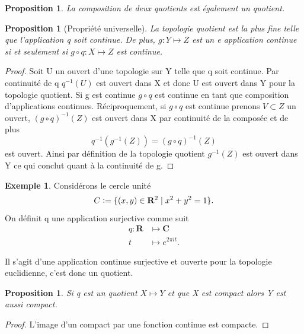\documentclass[12pt]{book}
\newcommand{\defeq}{\vcentcolon=}
\newtheorem{prop}[lemma]{Proposition}
\theoremstyle{definition}
\newtheorem{example}[lemma]{Exemple}
\theoremstyle{remark}
\begin{document}
	\begin{prop}
		La composition de deux quotients est également un quotient.
	\end{prop}
	\begin{prop}[Propriété universelle]
		La topologie quotient est la plus fine telle que l'application q soit continue. De plus, $g : Y \longmapsto Z$ est un e application continue si et seulement si	$g \circ q : X \longmapsto Z$ est continue.
	\end{prop}
	\begin{proof}
		Soit U un ouvert d'une topologie sur Y telle que q soit continue. Par continuité de q $q^{-1}(U)$ est ouvert dans X et donc U est ouvert dans Y pour la topologie quotient. 
		Si g est continue $g \circ q$ est continue en tant que composition d'applications continues. Réciproquement, si  $g \circ q$ est continue prenons $V \subset Z$ un ouvert, $(g\circ q)^{-1}(Z)$ est ouvert dans X par continuité de la composée et de plus \[
			q^{-1}(g^{-1}(Z)) = (g \circ q)^{-1}(Z)
		\] est ouvert. Ainsi par définition de la topologie quotient $g^{-1}(Z)$ est ouvert dans Y ce qui conclut quant à la continuité de g. 
	\end{proof}
	\begin{example}
		Considérons le cercle unité \[
			C \defeq \{(x,y) \in \mathbf{R}^2 \;|\; x^2 + y^2 = 1\} 
		.\] 
		On définit q une application surjective comme suit \\ 
			\begin{align*}
				q : \mathbf{R} &\longmapsto \mathbf{C}\\
				t&\longmapsto e^{2\pi it}
			.\end{align*}	

		Il s'agit d'une application continue surjective et ouverte pour la topologie euclidienne, c'est donc un quotient.
	\end{example}
	
	\begin{prop}
		Si q est un quotient $X \longmapsto Y$ et que X est compact alors Y est aussi compact.
	\end{prop}
	\begin{proof}
		L'image d'un compact par une fonction continue est compacte.
	\end{proof}
\end{document}
